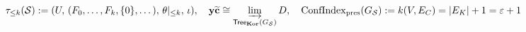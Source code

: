\documentclass[preview]{standalone}
\begin{document}
\begin{align*}
\special{dvisvgm:raw <g id='unique000'>}\tau_{\le k}(\mathcal{S}) := (U,\,(F_0,\dots,F_k,\{0\},\dots),\,\theta|_{\le k},\,\iota), \quad \mathbf{y}\widetilde{\mathbf{c}} \cong \varinjlim_{\mathsf{Tree}_{\mathbf{Kor}}(G_{\mathcal{S}})} D, \quad \operatorname{ConfIndex}_{\text{pres}}(G_{\mathcal{S}}) := k(V,E_C) = |E_K| + 1 = \varepsilon + 1\special{dvisvgm:raw </g>}
\end{align*}
\end{document}
